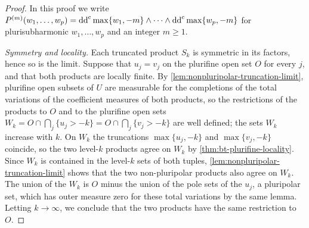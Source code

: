 \begin{proof}
In this proof we write $P^{(m)}(w_1,\ldots,w_p)=\mathrm{dd}^{\mathrm{c}}\max\{w_1,-m\}\wedge\cdots\wedge\mathrm{dd}^{\mathrm{c}}\max\{w_p,-m\}$ for plurisubharmonic $w_1,\ldots,w_p$ and an integer $m\geq1$.

\emph{Symmetry and locality.} Each truncated product $S_k$ is symmetric in its factors, hence so is the limit. Suppose that $u_j=v_j$ on the plurifine open set $O$ for every $j$, and that both products are locally finite. By \cref{lem:nonpluripolar-truncation-limit}, plurifine open subsets of $U$ are measurable for the completions of the total variations of the coefficient measures of both products, so the restrictions of the products to $O$ and to the plurifine open sets $W_k=O\cap\bigcap_j\{u_j>-k\}=O\cap\bigcap_j\{v_j>-k\}$ are well defined; the sets $W_k$ increase with $k$. On $W_k$ the truncations $\max\{u_j,-k\}$ and $\max\{v_j,-k\}$ coincide, so the two level-$k$ products agree on $W_k$ by \cref{thm:bt-plurifine-locality}. Since $W_k$ is contained in the level-$k$ sets of both tuples, \cref{lem:nonpluripolar-truncation-limit} shows that the two non-pluripolar products also agree on $W_k$. The union of the $W_k$ is $O$ minus the union of the pole sets of the $u_j$, a pluripolar set, which has outer measure zero for these total variations by the same lemma. Letting $k\to\infty$, we conclude that the two products have the same restriction to $O$.


\end{proof}
